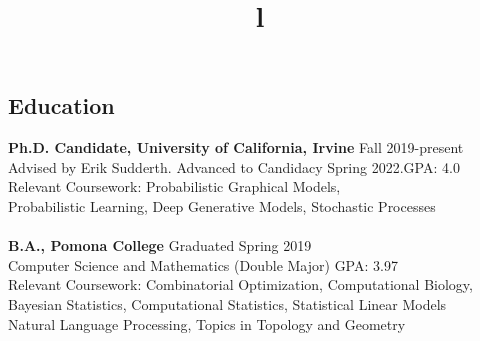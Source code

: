 \documentclass[margin]{res}
\begin{document}
\begin{resume}

\section{Education}
\textbf{Ph.D. Candidate, University of California, Irvine} \hfill Fall 2019-present\\
Advised by Erik Sudderth. Advanced to Candidacy Spring 2022.\hfill GPA: 4.0\\
Relevant Coursework: Probabilistic Graphical Models,\\Probabilistic Learning, Deep Generative Models, Stochastic Processes\\ \\
\textbf{B.A., Pomona College} \hfill Graduated Spring 2019\\
Computer Science and Mathematics (Double Major) \hfill GPA: 3.97\\
Relevant Coursework: Combinatorial Optimization, Computational Biology,\\
Bayesian Statistics, Computational Statistics, Statistical Linear Models\\
Natural Language Processing, Topics in Topology and Geometry


\begin{format}
\title{l}\\
\\
\body\\
\end{format}

%


\end{resume}
\end{document}
